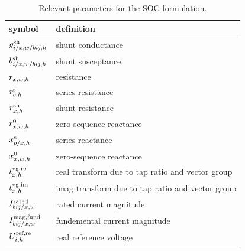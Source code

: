 \documentclass[journal]{IEEEtran}
\begin{document}
\begin{table}[H]
    \centering
    \caption{Relevant parameters for the SOC formulation.}
    \label{tab:parameters_soc}
    \begin{tabular}{l l }
        symbol                                                                      & definition                                        \\ \hline
        $g_{i/\text{$x$,}w/bij,h}^{\text{sh}}$     & shunt conductance                                 \\
        $b_{i/\text{$x$,}w/bij,h}^{\text{sh}}$     & shunt susceptance                                 \\
        $r_{x,w,h}$                                    & resistance                                        \\
        $r_{b,h}^{\text{s}}$                                        & series resistance                                 \\
        $r_{x,h}^{\text{sh}}$                                         & shunt resistance                                  \\
        $r^{\text{0}}_{x,w,h}$                         & zero-sequence reactance                           \\
        $x_{b/x,h}^{\text{s}}$                                   & series reactance                                  \\
        $x^{\text{0}}_{x,w,h}$                          & zero-sequence reactance                           \\ \hline
        $t^{\text{vg,re}}_{x,h}$                               & real transform due to tap ratio and vector group  \\
        $t^{\text{vg,im}}_{x,h}$                          & imag transform due to tap ratio and vector group  \\ \hline
        $I^{\text{rated}}_{bij/x,w}$                                 & rated current magnitude                           \\ 
        $I_{bij/\text{$x$,}w}^{\text{mag,fund}}$          & fundemental current magnitude                     \\ \hline
        $U^{\text{ref,re}}_{i,h}$                                         & real reference voltage                            \\

\end{tabular}
\end{table}
\end{document}
